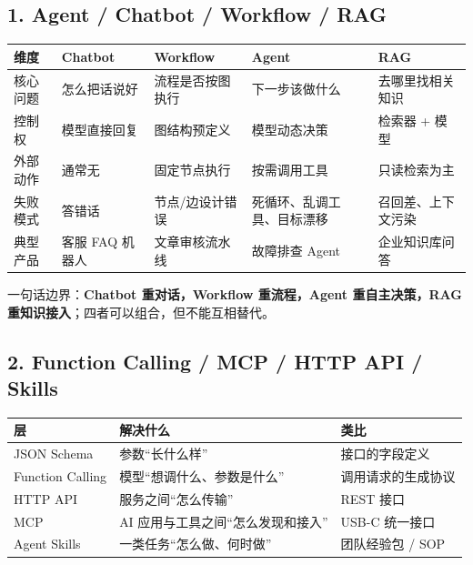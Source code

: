 \documentclass[9pt,a4paper,twocolumn]{ctexart}
\begin{document}
\subsection*{1. Agent / Chatbot / Workflow / RAG}

{\footnotesize
\begin{tabular}{|p{}|p{}|p{}|p{}|p{}|}
\hline
\textbf{维度} & \textbf{Chatbot} & \textbf{Workflow} & \textbf{Agent} & \textbf{RAG} \\
\hline
核心问题 & 怎么把话说好 & 流程是否按图执行 & 下一步该做什么 & 去哪里找相关知识 \\
\hline
控制权 & 模型直接回复 & 图结构预定义 & 模型动态决策 & 检索器 + 模型 \\
\hline
外部动作 & 通常无 & 固定节点执行 & 按需调用工具 & 只读检索为主 \\
\hline
失败模式 & 答错话 & 节点/边设计错误 & 死循环、乱调工具、目标漂移 & 召回差、上下文污染 \\
\hline
典型产品 & 客服 FAQ 机器人 & 文章审核流水线 & 故障排查 Agent & 企业知识库问答 \\
\hline
\end{tabular}
}



一句话边界：\textbf{Chatbot 重对话，Workflow 重流程，Agent 重自主决策，RAG 重知识接入}；四者可以组合，但不能互相替代。



\subsection*{2. Function Calling / MCP / HTTP API / Skills}

{\footnotesize
\begin{tabular}{|p{}|p{}|p{}|}
\hline
\textbf{层} & \textbf{解决什么} & \textbf{类比} \\
\hline
JSON Schema & 参数“长什么样” & 接口的字段定义 \\
\hline
Function Calling & 模型“想调什么、参数是什么” & 调用请求的生成协议 \\
\hline
HTTP API & 服务之间“怎么传输” & REST 接口 \\
\hline
MCP & AI 应用与工具之间“怎么发现和接入” & USB-C 统一接口 \\
\hline
Agent Skills & 一类任务“怎么做、何时做” & 团队经验包 / SOP \\
\hline
\end{tabular}
}
\end{document}
